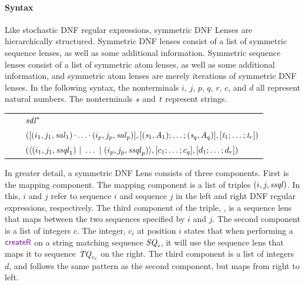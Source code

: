\documentclass[acmsmall,screen,anonymous]{acmart}
\begin{document}
\paragraph*{Syntax}
Like stochastic DNF regular expressions, symmetric DNF Lenses are hierarchically
structured. Symmetric DNF lenses consist of a list of symmetric sequence lenses,
as well as some additional information. Symmetric sequence lenses consist of a
list of symmetric atom lenses, as well
as some additional information, and
symmetric atom lenses are merely iterations of symmetric DNF lenses. In the
following syntax, the nonterminals $i$, $j$, $p$, $q$, $r$, $c$, and $d$ all
represent natural numbers. The nonterminals $\mathit{s}$ and $\mathit{t}$ represent
strings.
\begin{center}
  \begin{tabular}{@{}r@{\ }c@{}l@{}}
    \SAtomLens{} & \GEq{} & ${\mathit{sdl}}^*$ \\
    \SSQLens{} & \GEq{} & $([(i_1,j_1,\mathit{sal}_1)\mkern-1mu\cdot\mkern-1mu
                          \ldots\mkern-1mu\cdot\mkern-1mu
                          (i_p,j_p,\mathit{sal}_p)]
                          ,[ (\mathit{s}_1,\mathit{A}_1);\ldots;(\mathit{s}_q,\mathit{A}_q) ]
                          ,[ \mathit{t}_1;\ldots;\mathit{t}_r ])$ \\
    \SDNFLens{} & \GEq{} & $(\langle(i_1,j_1,\mathit{ssql}_1)~|~
                           \ldots~|~
                           (i_p,j_p,\mathit{ssql}_p)\rangle
                           ,[ c_1;\ldots;c_q ]
                           ,[ d_1;\ldots;d_r ])$ \\
  \end{tabular}
\end{center}

In greater detail, a symmetric DNF Lens \SDNFLens{} consists of three
components. First is the mapping component. The mapping component is a list of
triples $(i,j,\mathit{ssql})$. In this, $i$ and $j$ refer to sequence $i$ and
sequence $j$ in the left and right DNF regular expressions, respectively. The
third component of the triple, \SSQLens{}, is a sequence lens that maps between the two
sequences specified by $i$ and $j$. The second component is a list of integers
$c$. The integer, $c_i$ at position $i$ states that when performing a $\CreateR$
on a string matching sequence $\mathit{SQ}_i$, it will use the sequence lens that
maps it to sequence $\mathit{TQ}_{c_i}$ on the right. The third component is a
list of integers $d$, and follows the same pattern as the second component, but
maps from right to left.
\end{document}

